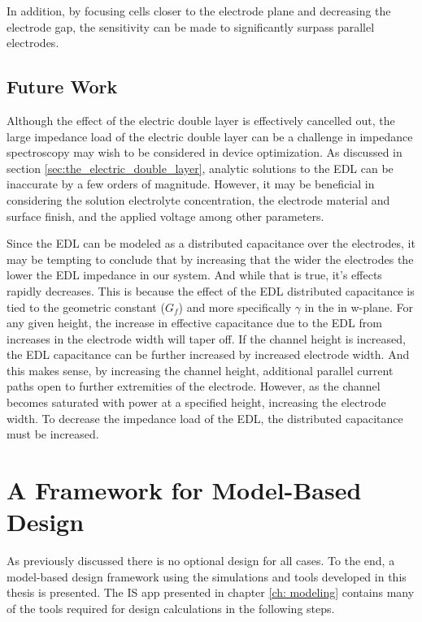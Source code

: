 \par In addition, by focusing cells closer to the electrode plane and decreasing the electrode gap, the sensitivity can be made to significantly surpass parallel electrodes.

\subsection*{Future Work}

\par Although the effect of the electric double layer is effectively cancelled out, the large impedance load of the electric double layer can be a challenge in impedance spectroscopy may wish to be considered in device optimization. As discussed in section \ref{sec:the_electric_double_layer}, analytic solutions to the EDL can be inaccurate by a few orders of magnitude. However, it may be beneficial in considering the solution electrolyte concentration, the electrode material and surface finish, and the applied voltage among other parameters. 

\par Since the EDL can be modeled as a distributed capacitance over the electrodes, it may be tempting to conclude that by increasing that the wider the electrodes the lower the EDL impedance in our system. And while that is true, it's effects rapidly decreases. This is because the effect of the EDL distributed capacitance is tied to the geometric constant ($G_f$) and more specifically $\gamma$ in the in w-plane. For any given height, the increase in effective capacitance due to the EDL from increases in the electrode width will taper off. If the channel height is increased, the EDL capacitance can be further increased by increased electrode width. And this makes sense, by increasing the channel height, additional parallel current paths open to further extremities of the electrode. However, as the channel becomes saturated with power at a specified height, increasing the electrode width. To decrease the impedance load of the EDL, the distributed capacitance must be increased. 

\section{A Framework for Model-Based Design}

\par As previously discussed there is no optional design for all cases. To the end, a model-based design framework using the simulations and tools developed in this thesis is presented. The IS app presented in chapter \ref{ch: modeling} contains many of the tools required for design calculations in the following steps.

